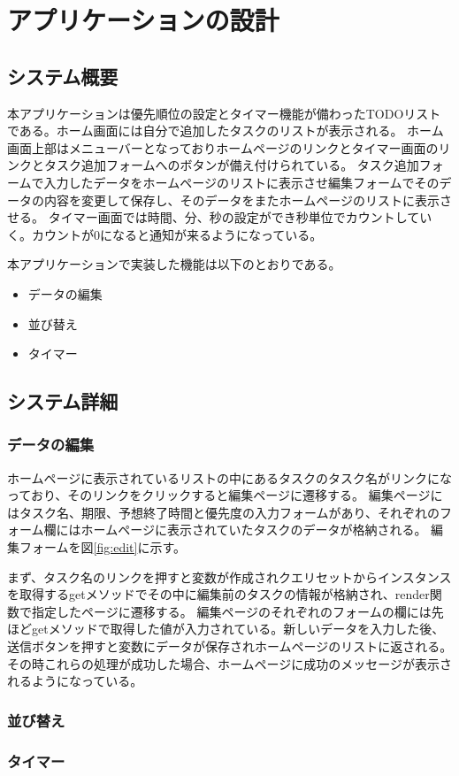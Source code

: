 \chapter{アプリケーションの設計}
\label{cha:function}

\section{システム概要}
本アプリケーションは優先順位の設定とタイマー機能が備わったTODOリストである。ホーム画面には自分で追加したタスクのリストが表示される。
ホーム画面上部はメニューバーとなっておりホームページのリンクとタイマー画面のリンクとタスク追加フォームへのボタンが備え付けられている。
タスク追加フォームで入力したデータをホームページのリストに表示させ編集フォームでそのデータの内容を変更して保存し、そのデータをまたホームページのリストに表示させる。
タイマー画面では時間、分、秒の設定ができ秒単位でカウントしていく。カウントが0になると通知が来るようになっている。

本アプリケーションで実装した機能は以下のとおりである。

\begin{itemize}
    \item データの編集
    \item 並び替え
    \item タイマー
\end{itemize}

\section{システム詳細}
\subsection{データの編集}
ホームページに表示されているリストの中にあるタスクのタスク名がリンクになっており、そのリンクをクリックすると編集ページに遷移する。
編集ページにはタスク名、期限、予想終了時間と優先度の入力フォームがあり、それぞれのフォーム欄にはホームページに表示されていたタスクのデータが格納される。
編集フォームを図\ref{fig:edit}に示す。

まず、タスク名のリンクを押すと変数が作成されクエリセットからインスタンスを取得するgetメソッドでその中に編集前のタスクの情報が格納され、render関数で指定したページに遷移する。
編集ページのそれぞれのフォームの欄には先ほどgetメソッドで取得した値が入力されている。新しいデータを入力した後、送信ボタンを押すと変数にデータが保存されホームページのリストに返される。
その時これらの処理が成功した場合、ホームページに成功のメッセージが表示されるようになっている。

\subsection{並び替え}

\subsection{タイマー}




